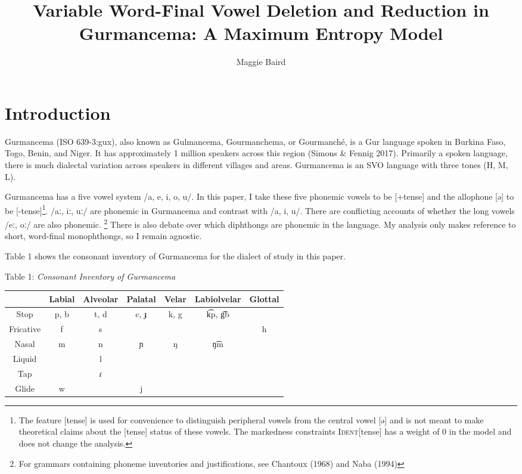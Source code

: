 \documentclass[output=paper,
modfonts
]{langscibook}
\title{Variable Word-Final Vowel Deletion and Reduction in Gurmancema: A Maximum Entropy Model}
\author{%
 Maggie Baird\affiliation{Dartmouth College}
}
\begin{document}
\pagestyle{myheadings}

\maketitle
\section{Introduction} 

Gurmancema (ISO 639-3:gux), also known as Gulmancema, Gourmanchema, or Gourmanché, is a Gur language spoken in Burkina Faso, Togo, Benin, and Niger. It has approximately 1 million speakers across this region (Simons \& Fennig 2017). Primarily a spoken language, there is much dialectal variation across speakers in different villages and areas. Gurmancema is an SVO language with three tones (H, M, L). 

Gurmancema has a five vowel system /a, e, i, o, u/. In this paper, I take these five phonemic vowels to be [+tense] and the allophone [ə] to be [-tense]\footnote{The feature [tense] is used for convenience to distinguish peripheral vowels from the central vowel [ə] and is not meant to make theoretical claims about the [tense] status of these vowels. The markedness constraints \textsc{Ident}[tense] has a weight of 0 in the model and does not change the analysis.}.  /aː, iː, uː/ are phonemic in Gurmancema and contrast with /a, i, u/. There are conflicting accounts of whether the long vowels /eː, oː/ are also phonemic. \footnote{For grammars containing phoneme inventories and justifications, see Chantoux (1968) and Naba 
(1994)}
There is also debate over which diphthongs are phonemic in the language. My 
analysis only makes reference to short, word-final monophthongs, so I remain 
agnostic.

Table 1 shows the consonant inventory of Gurmancema for the dialect of study in this paper. 

\begin{center} Table 1: \textit{Consonant Inventory of Gurmancema} \\
\vspace{5mm}
\renewcommand{\arraystretch}{1.5}
\begin{tabular}{ |c | c| c | c | c | c | c |}
\hline
  & Labial & Alveolar & Palatal & Velar & Labiolvelar & Glottal\\ 
 \hline
 Stop & p, b & t, d & c, ɟ & k, g & k͡p, g͡b & \\
 \hline
 Fricative & f & s &  &  &  & h\\
 \hline
 Nasal & m & n & ɲ & ŋ & ŋ͡m & \\
 \hline
 Liquid &  & l &  &  & & \\
 \hline
 Tap &  & ɾ  &  &  &  & \\
 \hline
 Glide & w & & j & &  & \\
 \hline
\end{tabular}
\end{center}
\end{document}
